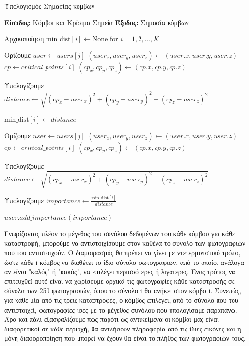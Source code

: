 \vspace{-3pt}
\begin{algorithm}[H]
    \caption{Υπολογισμός Σημασίας κόμβων} \label{algorithm3}
    \begin{algorithmic}[1]
    \STATE \textbf{Είσοδος:} Κόμβοι και Κρίσιμα Σημεία
    \STATE \textbf{Έξοδος:} Σημασία κόμβων

        \STATE Αρχικοποίηση $\text{min\_dist}[i] \gets \text{None}$ for $i = 1, 2, \dots, K$

                \STATE Ορίζουμε $user \gets users[j]$
                \STATE $(user_x, user_y, user_z) \gets (user.x, user.y, user.z)$
                \STATE $cp \gets critical\_points[i]$
                \STATE $(cp_x, cp_y, cp_z) \gets (cp.x, cp.y, cp.z)$
                
                \STATE Υπολογίζουμε $distance \gets \sqrt{(cp_x - user_x)^2 + (cp_y - user_y)^2 + (cp_z - user_z)^2}$
                
                    \STATE $\text{min\_dist}[i] \gets distance$
                \ENDIF
            \ENDFOR
    
                \STATE Ορίζουμε $user \gets users[j]$
                \STATE $(user_x, user_y, user_z) \gets (user.x, user.y, user.z)$
                \STATE $cp \gets critical\_points[i]$
                \STATE $(cp_x, cp_y, cp_z) \gets (cp.x, cp.y, cp.z)$
                
                \STATE Υπολογίζουμε $distance \gets \sqrt{(cp_x - user_x)^2 + (cp_y - user_y)^2 + (cp_z - user_z)^2}$
                
                \STATE Υπολογίζουμε $importance \gets \frac{\text{min\_dist}[i]}{distance}$
                
                \STATE $user.add\_importance(importance)$
            \ENDFOR
        \ENDFOR
    \ENDFOR
    \end{algorithmic}
\end{algorithm}
\vspace{-15pt}

\newpage
    
Γνωρίζοντας πλέον το μέγεθος του συνόλου δεδομένων του κάθε κόμβου για κάθε καταστροφή, μπορούμε να αντιστοιχίσουμε στον καθένα το σύνολο των φωτογραφιών που του αντιστοιχούν. Ο διαμοιρασμός θα πρέπει να γίνει με ντετερμινιστικό τρόπο, ώστε κάθε i κόμβος να διαθέτει το ίδιο σύνολο φωτογραφιών, από το οποίο, ανάλογα αν είναι "καλός" ή "κακός", να επιλέγει περισσότερες ή λιγότερες. Ένας τρόπος να επιτευχθεί αυτό είναι να χωρίσουμε αρχικά τις φωτογραφίες κάθε καταστροφής σε σύνολα των 250 φωτογραφιών, όπου το σύνολο i θα ανήκει στον κόμβο i. Συνεπώς, για κάθε μία από τις τρεις καταστροφές, ο κόμβος επιλέγει, από το σύνολο που του αντιστοιχεί, φωτογραφίες ίσες με το μέγεθος συνόλου που υπολογίσαμε παραπάνω. Άρα και πάλι εξασφαλίζουμε πως παρότι ως αντικείμενα οι κόμβοι μας είναι διαφορετικοί σε κάθε περιοχή, θα αντλήσουν πληροφορία από τις ίδιες εικόνες και η μόνη διαφοροποίηση που μπορεί να έχουν θα είναι το πλήθος των φωτογραφιών τους.

